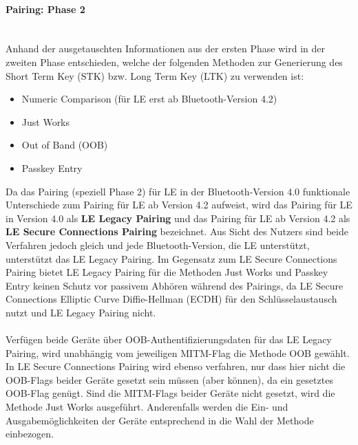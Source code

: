 \paragraph{Pairing: Phase 2} \mbox{} \vspace{0.2cm} \\
Anhand der ausgetauschten Informationen aus der ersten Phase wird in der zweiten Phase entschieden, welche der folgenden Methoden zur Generierung des Short Term Key (STK) bzw. Long Term Key (LTK) zu verwenden ist:
\begin{itemize}
    \item{Numeric Comparison (für LE erst ab Bluetooth-Version 4.2)}
    \item{Just Works}
    \item{Out of Band (OOB)}
    \item{Passkey Entry}
\end{itemize}
Da das Pairing (speziell Phase 2) für LE in der Bluetooth-Version 4.0 funktionale Unterschiede zum Pairing für LE ab Version 4.2 aufweist, wird das Pairing für LE in Version 4.0 als \textbf{LE Legacy Pairing} und das Pairing für LE ab Version 4.2 als \textbf{LE Secure Connections Pairing} bezeichnet. Aus Sicht des Nutzers sind beide Verfahren jedoch gleich und jede Bluetooth-Version, die LE unterstützt, unterstützt das LE Legacy Pairing. Im Gegensatz zum LE Secure Connections Pairing bietet LE Legacy Pairing für die Methoden Just Works und Passkey Entry keinen Schutz vor passivem Abhören während des Pairings, da LE Secure Connections Elliptic Curve Diffie-Hellman (ECDH) für den Schlüsselaustausch nutzt und LE Legacy Pairing nicht. \cite{BtSpec4.2_248}
\\\\
Verfügen beide Geräte über OOB-Authentifizierungsdaten für das LE Legacy Pairing, wird unabhängig vom jeweiligen MITM-Flag die Methode OOB gewählt. In LE Secure Connections Pairing wird ebenso verfahren, nur dass hier nicht die OOB-Flags beider Geräte gesetzt sein müssen (aber können), da ein gesetztes OOB-Flag genügt. Sind die MITM-Flags beider Geräte nicht gesetzt, wird die Methode Just Works ausgeführt. Anderenfalls werden die Ein- und Ausgabemöglichkeiten der Geräte entsprechend \cite{BtSpec4.2_tab_2302-2303} in die Wahl der Methode einbezogen.

